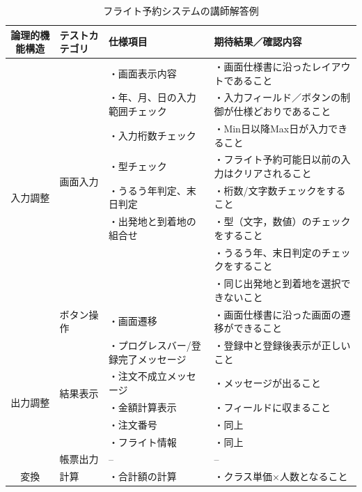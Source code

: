 \begin{table}[htbp]
\footnotesize
  \centering
  \caption{フライト予約システムの講師解答例}
    \begin{tabular}{|c|l|p{10.5em}|p{13em}|}
    \hline
    \multicolumn{1}{|p{7em}|}{論理的機能構造} & \multicolumn{1}{p{7em}|}{テストカテゴリ} & 仕様項目  & 期待結果／確認内容 \bigstrut\\
    \hline
    \hline
    \multicolumn{1}{|c|}{\multirow{9}[4]{*}{入力調整}} & \multicolumn{1}{l|}{\multirow{8}[2]{*}{画面入力}} & ・画面表示内容 & ・画面仕様書に沿ったレイアウトであること \bigstrut[t]\\
          &       & ・年、月、日の入力範囲チェック & ・入力フィールド／ボタンの制御が仕様どおりであること \\
          &       & ・入力桁数チェック & ・Min日以降Max日が入力できること\\
          &       & ・型チェック & ・フライト予約可能日以前の入力はクリアされること\\
          &       & ・うるう年判定、末日判定 & ・桁数/文字数チェックをすること\\
          &       & ・出発地と到着地の組合せ & ・型（文字，数値）のチェックをすること\\
          &       & \multicolumn{1}{r|}{} & ・うるう年、末日判定のチェックをすること \\
          &       & \multicolumn{1}{r|}{} & ・同じ出発地と到着地を選択できないこと \bigstrut[b]\\
\cline{2-4}          & \multicolumn{1}{p{7.75em}|}{ボタン操作} & ・画面遷移 & ・画面仕様書に沿った画面の遷移ができること \bigstrut\\
    \hline
    \multicolumn{1}{|c|}{\multirow{6}[4]{*}{出力調整}} & \multicolumn{1}{l|}{\multirow{5}[2]{*}{結果表示}} & ・プログレスバー/登録完了メッセージ & ・登録中と登録後表示が正しいこと \bigstrut[t]\\
          &       & ・注文不成立メッセージ & ・メッセージが出ること \\
          &       & ・金額計算表示 & ・フィールドに収まること \\
          &       & ・注文番号 & ・同上 \\
          &       & ・フライト情報 & ・同上\bigstrut[b]\\
\cline{2-4}          & \multicolumn{1}{p{7.75em}|}{帳票出力} & --    & -- \bigstrut\\
    \hline
    \multicolumn{1}{|c|}{\multirow{3}[2]{*}{変換}} & \multicolumn{1}{l|}{\multirow{4}[2]{*}{計算}} & ・合計額の計算 & ・クラス単価×人数となること \bigstrut[t]\\

\end{tabular}
\end{table}
